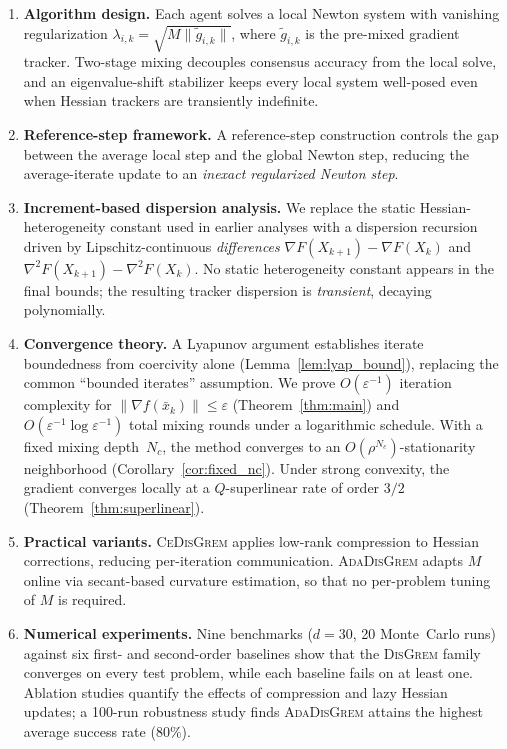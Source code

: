 \documentclass[11pt,a4paper]{article}
\def\cO{O}%
\newcommand{\cO}{\mathcal{O}}
\begin{document}
\begin{enumerate}[label=(\alph*),leftmargin=2em,itemsep=3pt]
	\item \textbf{Algorithm design.}
	Each agent solves a local Newton system with vanishing regularization
	$\lambda_{i,k}=\sqrt{M\|\tilde g_{i,k}\|}$, where
	$\tilde g_{i,k}$ is the pre-mixed gradient tracker.
	Two-stage mixing decouples consensus accuracy from the local solve,
	and an eigenvalue-shift stabilizer keeps every local system
	well-posed even when Hessian trackers are transiently indefinite.

	\item \textbf{Reference-step framework.}
	A reference-step construction controls the gap between the average
	local step and the global Newton step, reducing the average-iterate
	update to an \emph{inexact regularized Newton step}.

	\item \textbf{Increment-based dispersion analysis.}
	We replace the static Hessian-heterogeneity constant used in earlier
	analyses with a dispersion recursion driven by Lipschitz-continuous
	\emph{differences} $\nabla F(X_{k+1})-\nabla F(X_k)$ and
	$\nabla^2 F(X_{k+1})-\nabla^2 F(X_k)$.
	No static heterogeneity constant appears in the final bounds;
	the resulting tracker dispersion is \emph{transient}, decaying
	polynomially.

	\item \textbf{Convergence theory.}
	A Lyapunov argument establishes iterate boundedness from coercivity
	alone (Lemma~\ref{lem:lyap_bound}), replacing the
	common ``bounded iterates'' assumption.
	We prove
	$\cO(\varepsilon^{-1})$ iteration complexity for
	$\|\nabla f(\bar x_k)\|\le\varepsilon$ (Theorem~\ref{thm:main})
	and $\cO(\varepsilon^{-1}\log\varepsilon^{-1})$ total mixing
	rounds under a logarithmic schedule.
	With a fixed mixing depth~$N_c$, the method converges to an
	$\cO(\rho^{N_c})$-stationarity neighborhood
	(Corollary~\ref{cor:fixed_nc}).
	Under strong convexity, the gradient converges locally at a
	$Q$-superlinear rate of order $3/2$ (Theorem~\ref{thm:superlinear}).

	\item \textbf{Practical variants.}
	\textsc{CeDisGrem} applies low-rank compression to Hessian
	corrections, reducing per-iteration communication.
	\textsc{AdaDisGrem} adapts $M$ online via secant-based curvature
	estimation, so that no per-problem tuning of $M$ is required.

	\item \textbf{Numerical experiments.}
	Nine benchmarks ($d=30$, 20 Monte~Carlo runs) against six first- and
	second-order baselines show that the \textsc{DisGrem} family converges on
	every test problem, while each baseline fails on at least one.
	Ablation studies quantify the effects of compression and lazy Hessian
	updates; a 100-run robustness study finds \textsc{AdaDisGrem} attains
	the highest average success rate (80\%).
\end{enumerate}
\end{document}
